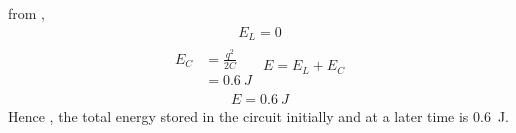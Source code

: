 \documentclass[beamer]{IEEEtran}
\theoremstyle{remark}
\begin{document}
from \brak{\ref{1}},
\begin{align}
    E_L=0
\end{align}
\begin{gather}
\begin{align}
	E_C&=\frac{q^2}{2C}\\
       &=0.6\ J
\end{align}
\begin{align}
    E=E_L+E_C
\end{align}
\end{gather}
\begin{align}
    E=0.6\ J
\end{align}
Hence , the total energy stored in the circuit initially and at a later time is 0.6\ J.
\end{document}
